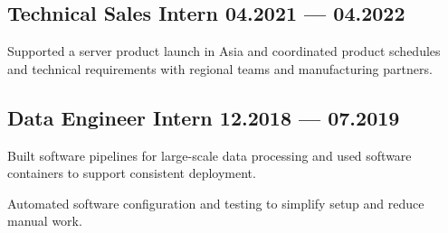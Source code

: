 \subsection{{Technical Sales Intern \hfill 04.2021 --- 04.2022}}
\begin{zitemize}
    \item Supported a server product launch in Asia and coordinated product schedules and technical requirements with regional teams and manufacturing partners.
\end{zitemize}

\subsection{{Data Engineer Intern \hfill 12.2018 --- 07.2019}}
\begin{zitemize}
    \item Built software pipelines for large-scale data processing and used software containers to support consistent deployment.
    \item Automated software configuration and testing to simplify setup and reduce manual work.
\end{zitemize}
